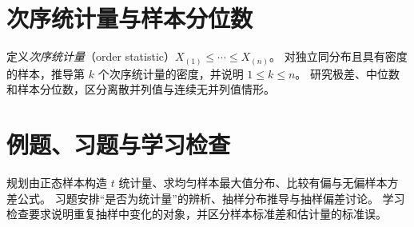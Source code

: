 \section{次序统计量与样本分位数}
\label{sec:ps-order-statistics}
定义\emph{次序统计量}（order statistic）$X_{(1)}\leq\cdots\leq X_{(n)}$。
对独立同分布且具有密度的样本，推导第 $k$ 个次序统计量的密度，并说明 $1\leq k\leq n$。
研究极差、中位数和样本分位数，区分离散并列值与连续无并列值情形。

\section{例题、习题与学习检查}
规划由正态样本构造 $t$ 统计量、求均匀样本最大值分布、比较有偏与无偏样本方差公式。
习题安排“是否为统计量”的辨析、抽样分布推导与抽样偏差讨论。
学习检查要求说明重复抽样中变化的对象，并区分样本标准差和估计量的标准误。






